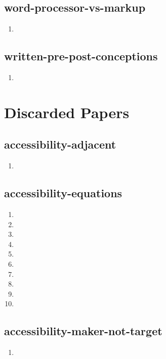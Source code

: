 \documentclass{article}
\begin{document}
\subsection{word-processor-vs-markup}
\begin{enumerate}
\item {}
\end{enumerate}

\subsection{written-pre-post-conceptions}
\begin{enumerate}
\item {}
\end{enumerate}

\section{Discarded Papers}
\subsection{accessibility-adjacent}
\begin{enumerate}
\item {}
\end{enumerate}

\subsection{accessibility-equations}
\begin{enumerate}
\item {}
\item {}
\item {}
\item {}
\item {}
\item {}
\item {}
\item {}
\item {}
\item {}
\end{enumerate}

\subsection{accessibility-maker-not-target}
\begin{enumerate}
\item {}
\end{enumerate}
\end{document}
